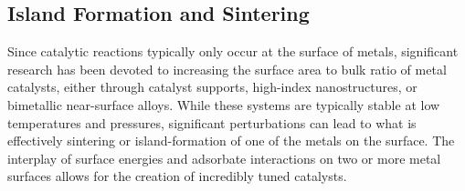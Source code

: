 \subsection{Island Formation and Sintering}
Since catalytic reactions typically only occur at the surface of metals, significant
research has been devoted to increasing the surface area to bulk ratio of metal
catalysts, either through catalyst supports, high-index nanostructures, or
bimetallic near-surface alloys. While these systems are typically stable at low
temperatures and pressures, significant perturbations can lead to what is
effectively sintering or island-formation of one of the metals on the surface.
The interplay of surface energies and adsorbate interactions on two or more
metal surfaces allows for the creation of incredibly tuned catalysts.
